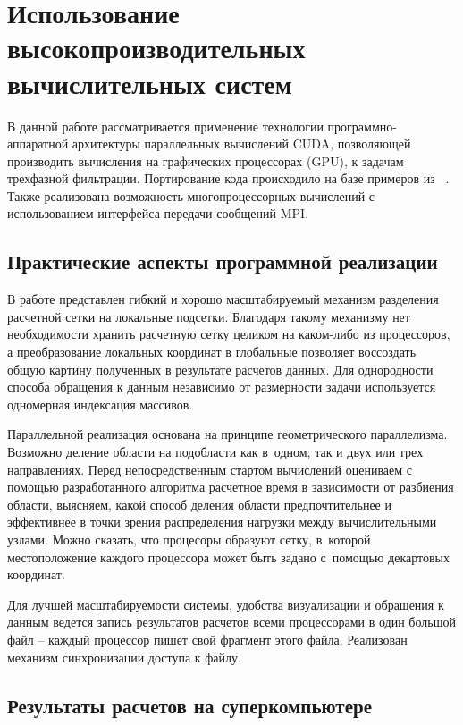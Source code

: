 \chapter{Использование высокопроизводительных вычислительных систем} \label{ch:ch4}

В данной работе рассматривается применение технологии программно-аппаратной архитектуры параллельных вычислений CUDA, позволяющей производить вычисления на графических процессорах (GPU), к задачам трехфазной фильтрации.
Портирование кода происходило на базе примеров из ~\cite{Sanders-CUDA}.
Также реализована возможность многопроцессорных вычислений с использованием
интерфейса передачи сообщений MPI.

\section{Практические аспекты программной реализации} \label{ch:ch4/sect1}

В работе представлен гибкий и хорошо масштабируемый механизм разделения
расчетной сетки на локальные подсетки. Благодаря такому механизму
нет необходимости хранить расчетную сетку целиком на каком-либо из
процессоров, а преобразование локальных координат в глобальные
позволяет воссоздать общую картину полученных в результате расчетов
данных. Для однородности способа обращения к данным независимо
от размерности задачи используется одномерная индексация массивов.

Параллельной реализация основана на принципе геометрического параллелизма.
Возможно деление области на подобласти как в~одном, так и двух или трех направлениях.
Перед непосредственным стартом вычислений оцениваем с помощью разработанного алгоритма расчетное время в зависимости от разбиения
области, выясняем, какой способ деления области предпочтительнее и эффективнее в точки зрения распределения нагрузки между вычислительными узлами.
Можно сказать, что процесоры образуют сетку, в~которой местоположение каждого процессора может быть задано с~помощью декартовых координат.

Для лучшей масштабируемости системы, удобства визуализации и обращения
к данным ведется запись результатов расчетов всеми процессорами в один большой файл -- каждый процессор
пишет свой фрагмент этого файла. Реализован механизм синхронизации доступа к файлу.

\section{Результаты расчетов на суперкомпьютере} \label{ch:ch4/sect2}

